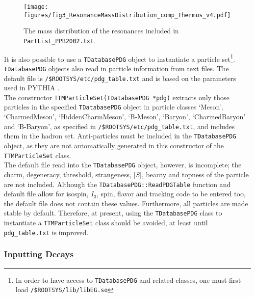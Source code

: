 \documentclass{elsarticle}
\begin{document}
\begin{figure}
\begin{center}
\texttt{[image: figures/fig3\_ResonanceMassDistribution\_comp\_Thermus\_v4.pdf]}
\caption{The mass distribution 
of the resonances included in \texttt{PartList\_PPB2002.txt}.}\label{ResDistr}
\end{center}
\end{figure}

It is also possible to use a \texttt{TDatabasePDG} object to instantiate a particle set\footnote{In order 
to have access to \texttt{TDatabasePDG} and related classes, one must first load 
\texttt{/\$ROOTSYS/lib/libEG.so}}. \texttt{TDatabasePDG} objects also read in particle information from text 
files. The default file is \texttt{/\$ROOTSYS/etc/pdg\_table.txt} and is based on the parameters used in PYTHIA \cite{Sjostrand:2000wi}.\\

The constructor \texttt{TTMParticleSet(TDatabasePDG *pdg)} extracts only those particles in 
the specified \texttt{TDatabasePDG} object in particle classes `Meson', `CharmedMeson', `HiddenCharmMeson', 
`B-Meson', `Baryon', `CharmedBaryon' and `B-Baryon', as specified in \texttt{/\$ROOTSYS/etc/pdg\_table.txt}, 
and includes them in the hadron set. Anti-particles must be included in the \texttt{TDatabasePDG} object, 
as they are not automatically generated in this constructor of the \texttt{TTMParticleSet} class.\\

The default file read into the \texttt{TDatabasePDG} object, however, is incomplete; the charm, degeneracy, 
threshold, strangeness, $\left|S\right|$, beauty and topness of the particle are not included. 
Although the \texttt{TDatabasePDG::ReadPDGTable} function and default file allow for isospin, 
$I_3$, spin, flavor and tracking code to be entered too, the default file does not contain these values. 
Furthermore, all particles are made stable by default. Therefore, at present, using the 
\texttt{TDatabasePDG} 
class to instantiate a \texttt{TTMParticleSet} class should be avoided, at least until \texttt{pdg\_table.txt} is improved. 

\subsubsection{Inputting Decays}
\end{document}
